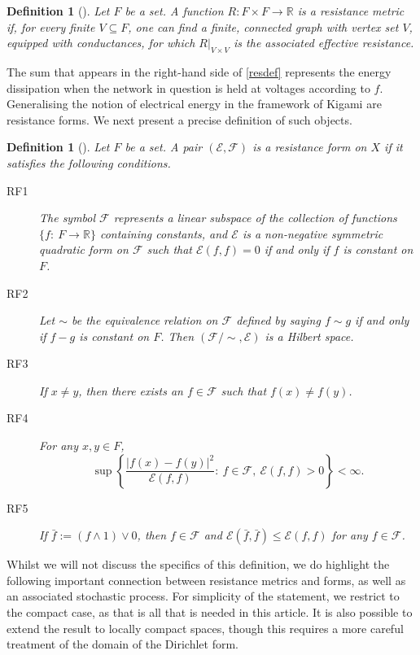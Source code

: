 \documentclass[a4paper, 11pt]{article}
\newtheorem{definition}[theorem]{Definition}
\begin{document}
\begin{definition}[{\cite[Definition 2.3.2]{AOF}}]\label{resdefdef} Let $F$ be a set. A function $R:F\times F\rightarrow \mathbb{R}$ is a \emph{resistance metric} if, for every finite $V \subseteq F$, one can find a finite, connected graph with vertex set $V$, equipped with conductances, for which $R|_{V\times V}$ is the associated effective resistance.
\end{definition}

The sum that appears in the right-hand side of \eqref{resdef} represents the energy dissipation when the network in question is held at voltages according to $f$. Generalising the notion of electrical energy in the framework of Kigami are resistance forms. We next present a precise definition of such objects.

\begin{definition}[{\cite[Definition 2.3.1]{AOF}}]\label{resformdef} Let $F$ be a set. A pair $(\mathcal{E},\mathcal{F})$ is a resistance form on $X$ if it satisfies the following conditions.
\begin{description}
  \item[RF1] The symbol $\mathcal{F}$ represents a linear subspace of the collection of functions $\{f:\:F\rightarrow \mathbb{R}\}$ containing constants, and $\mathcal{E}$ is a non-negative symmetric quadratic form on $\mathcal{F}$ such that $\mathcal{E}(f,f)=0$ if and only if $f$ is constant on ${F}$.
  \item[RF2] Let $\sim$ be the equivalence relation on $\mathcal{F}$ defined by saying $f\sim g$ if and only if $f-g$ is constant on $F$. Then $(\mathcal{F}/\sim,\mathcal{E})$ is a Hilbert space.
  \item[RF3] If $x\neq y$, then there exists an $f\in \mathcal{F}$ such that $f(x)\neq f(y)$.
  \item[RF4] For any $x,y\in F$,
  \[\sup\left\{\frac{|f(x)-f(y)|^2}{\mathcal{E}(f,f)}:\:f\in\mathcal{F},\:\mathcal{E}(f,f)>0\right\}<\infty.\]
  \item[RF5] If $\bar{f}:=(f\wedge 1)\vee 0$, then $f\in\mathcal{F}$ and $\mathcal{E}(\bar{f},\bar{f})\leq \mathcal{E}(f,f)$ for any $f\in\mathcal{F}$.
\end{description}
\end{definition}

Whilst we will not discuss the specifics of this definition, we do highlight the following important connection between resistance metrics and forms, as well as an associated stochastic process. For simplicity of the statement, we restrict to the compact case, as that is all that is needed in this article. It is also possible to extend the result to locally compact spaces, though this requires a more careful treatment of the domain of the Dirichlet form.
\end{document}
